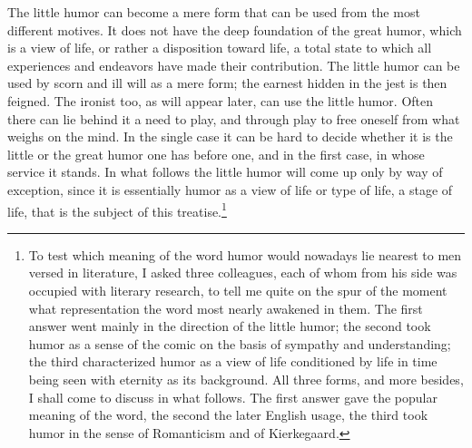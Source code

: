 \documentclass[12pt]{book}
\newcommand{\opage}[1]{\marginnote{\footnotesize\textit{[#1]}}}
\begin{document}
The little humor can become a mere form that can be used from the most different
motives. It does not have the deep foundation of the great humor, which is a view
of life, or rather a disposition toward life, a total state to which all
experiences and endeavors have made their contribution. The little humor can be
used by scorn and ill will as a mere form; the earnest hidden in the jest is then
feigned. The ironist too, as will appear later, can use the little humor. Often
there can lie behind it a need to play, and through play to free oneself from what
weighs on the mind. In the single case it can be hard to decide whether \opage{45}it
is the little or the great humor one has before one, and in the first case, in
whose service it stands. In what follows the little humor will come up only by way
of exception, since it is essentially humor as a view of life or type of life, a
stage of life, that is the subject of this treatise.\footnote{To test which
meaning of the word humor would nowadays lie nearest to men versed in literature, I
asked three colleagues, each of whom from his side was occupied with literary
research, to tell me quite on the spur of the moment what representation the word
most nearly awakened in them. The first answer went mainly in the direction of the
little humor; the second took humor as a sense of the comic on the basis of
sympathy and understanding; the third characterized humor as a view of life
conditioned by life in time being seen with eternity as its background. All three
forms, and more besides, I shall come to discuss in what follows. The first answer
gave the popular meaning of the word, the second the later English usage, the third
took humor in the sense of Romanticism and of Kierkegaard.}
\end{document}
